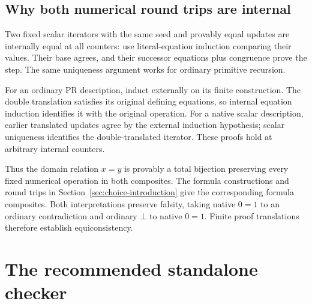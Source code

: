 \documentclass[11pt,letterpaper]{article}
\theoremstyle{definition}\newtheorem{definition}[theorem]{Definition}
\theoremstyle{remark}\newtheorem{remark}[theorem]{Remark}
\begin{document}
\subsection{Why both numerical round trips are internal}

Two fixed scalar iterators with the same seed and provably equal
updates are internally equal at all counters: use literal-equation
induction comparing their values. Their base agrees, and their
successor equations plus congruence prove the step. The same
uniqueness argument works for ordinary primitive recursion.

For an ordinary PR description, induct externally on its finite
construction. The double translation satisfies its original
defining equations, so internal equation induction identifies it
with the original operation. For a native scalar description,
earlier translated updates agree by the external induction
hypothesis; scalar uniqueness identifies the double-translated
iterator. These proofs hold at arbitrary internal counters.

Thus the domain relation $x=y$ is provably a total bijection
preserving every fixed numerical operation in both composites.
The formula constructions and round trips in
Section~\ref{sec:choice-introduction} give the corresponding formula
composites. Both interpretations preserve falsity, taking native
$0=1$ to an ordinary contradiction and ordinary $\bot$ to native
$0=1$. Finite proof translations therefore establish equiconsistency.

\clearpage
\section{The recommended standalone checker}
\label{app:code}
\end{document}
